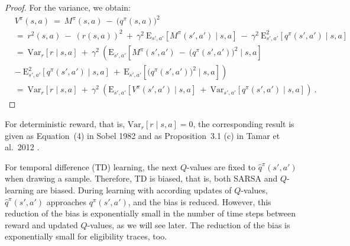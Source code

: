 \documentclass{article}
\newcommand\EXP{\mathbf{\mathrm{E}}}
\newcommand\VAR{\mathbf{\mathrm{Var}}}
\begin{document}
\begin{appendices}
\begin{proof}
For the variance, we obtain:
\begin{align}
  \label{eq:Avarq1}
  &V^{\pi}(s,a) \ = \  M^{\pi}(s,a) \ - \  \big( q^{\pi}(s,a)
  \big)^2 \\\nonumber
  &= \ r^2(s,a) \ - \ (r(s,a))^2  \ + \ \gamma^2  \  \EXP_{s',a'} \left[M^{\pi}(s',a') \mid s,a\right]
  \ - \  \gamma^2 \
  \EXP_{s',a'}^2 \left[q^\pi(s', a') \mid s,a\right]
 \\\nonumber
  &= \ \VAR_r \left[ r \mid s,a \right] \ + \ \gamma^2  \  \left(
    \EXP_{s',a'}  \left[M^{\pi}(s',a') \ - \
      \big( q^\pi (s', a')\big)^2\mid s,a\right] \right. \\ \nonumber
   &\left. - \  
  \EXP_{s',a'}^2 \left[q^\pi(s', a') \mid s,a\right] \ + \ 
  \EXP_{s',a'} \left[ \big( q^\pi (s', a')\big)^2\mid s,a\right] \right)
 \\\nonumber
  &= \ \VAR_r \left[ r \mid s,a \right] \ + \ \gamma^2  \  \left(
    \EXP_{s',a'}  \left[V^{\pi}(s',a') \mid s,a\right]
  \ + \   \VAR_{s',a'} \left[q^\pi(s', a') \mid s,a\right]  \right)
  \ .  
\end{align}
\end{proof}


For deterministic reward, that is,
$\VAR_r \left[ r \mid s,a \right]=0$,
the corresponding result is given as
Equation~(4) in Sobel 1982 \cite{Sobel:82}
and as Proposition~3.1 (c) in Tamar et al.\ 2012 \cite{Tamar:12}.

For temporal difference (TD) learning,
the next $Q$-values are fixed to $\hat{q}^\pi(s', a')$ when drawing a sample.
Therefore, TD is biased, that is, both SARSA and $Q$-learning are biased.
During learning with according updates of $Q$-values, $\hat{q}^\pi(s', a')$
approaches $q^\pi(s', a')$, and the bias is reduced.
However, this reduction of the bias is exponentially small in the number of time
steps between reward and updated $Q$-values, as we will see later.
The reduction of the bias is exponentially small for eligibility
traces, too.




\end{appendices}
\end{document}
